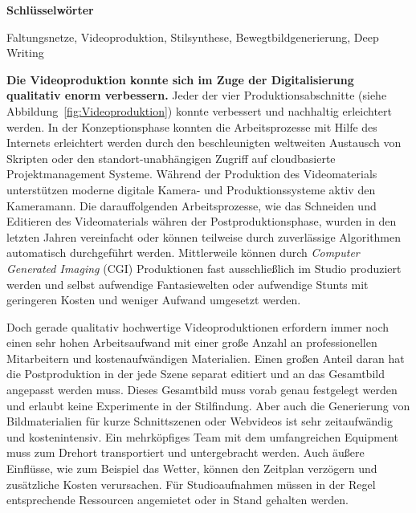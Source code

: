 \documentclass[times, 11pt,twocolumn]{article}
\begin{document}
\large{\textbf{Schl\"usselw\"orter}}\\ \small %

 Faltungsnetze, Videoproduktion, Stilsynthese, Bewegtbildgenerierung, Deep Writing



 \label{sec:Einleitung}
\textbf{Die Videoproduktion konnte sich im Zuge der Digitalisierung qualitativ enorm verbessern.} Jeder der vier Produktionsabschnitte (siehe Abbildung~\ref{fig:Videoproduktion}) konnte verbessert und nachhaltig erleichtert werden. In der Konzeptionsphase konnten die Arbeitsprozesse mit Hilfe des Internets erleichtert werden durch den beschleunigten weltweiten Austausch von Skripten oder den standort-unabhängigen Zugriff auf cloudbasierte Projektmanagement Systeme. Während der Produktion des Videomaterials unterstützen moderne digitale Kamera- und Produktionssysteme aktiv den Kameramann. Die darauffolgenden Arbeitsprozesse, wie das Schneiden und Editieren des Videomaterials währen der Postproduktionsphase, wurden in den letzten Jahren vereinfacht oder können teilweise durch zuverlässige Algorithmen automatisch durchgeführt werden. Mittlerweile können durch \textit{Computer Generated Imaging} (CGI) Produktionen fast ausschließlich im Studio produziert werden und selbst aufwendige Fantasiewelten oder aufwendige Stunts mit geringeren Kosten und weniger Aufwand umgesetzt werden.

Doch gerade qualitativ hochwertige Videoproduktionen erfordern immer noch einen sehr hohen Arbeitsaufwand mit einer große Anzahl an professionellen Mitarbeitern und kostenaufwändigen Materialien. Einen großen Anteil daran hat die Postproduktion in der jede Szene separat editiert und an das Gesamtbild angepasst werden muss. Dieses Gesamtbild muss vorab genau festgelegt werden und erlaubt keine Experimente in der Stilfindung. Aber auch die Generierung von Bildmaterialien für kurze Schnittszenen oder Webvideos ist sehr zeitaufwändig und kostenintensiv. Ein mehrköpfiges Team mit dem umfangreichen Equipment muss zum Drehort transportiert und untergebracht werden. Auch äußere Einflüsse, wie zum Beispiel das Wetter, können den Zeitplan verzögern und zusätzliche Kosten verursachen. Für Studioaufnahmen müssen in der Regel entsprechende Ressourcen angemietet oder in Stand gehalten werden.
\end{document}
